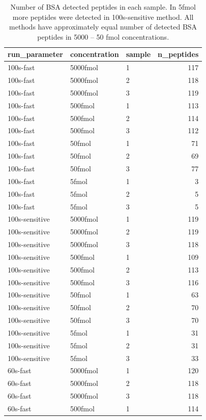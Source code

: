 \documentclass[]{article}
\begin{document}
\begin{table}
\caption{\label{tab:tbl1}Number of BSA detected peptides in each sample. In 5fmol more peptides were detected in 100s-sensitive method. All methods have approximately equal number of detected BSA peptides in 5000 -- 50 fmol concentrations.}
\centering
\begin{tabular}[t]{l|l|l|r}
\hline
run\_parameter & concentration & sample & n\_peptides\\
\hline
100s-fast & 5000fmol & 1 & 117\\
\hline
100s-fast & 5000fmol & 2 & 118\\
\hline
100s-fast & 5000fmol & 3 & 119\\
\hline
100s-fast & 500fmol & 1 & 113\\
\hline
100s-fast & 500fmol & 2 & 114\\
\hline
100s-fast & 500fmol & 3 & 112\\
\hline
100s-fast & 50fmol & 1 & 71\\
\hline
100s-fast & 50fmol & 2 & 69\\
\hline
100s-fast & 50fmol & 3 & 77\\
\hline
100s-fast & 5fmol & 1 & 3\\
\hline
100s-fast & 5fmol & 2 & 5\\
\hline
100s-fast & 5fmol & 3 & 5\\
\hline
100s-sensitive & 5000fmol & 1 & 119\\
\hline
100s-sensitive & 5000fmol & 2 & 119\\
\hline
100s-sensitive & 5000fmol & 3 & 118\\
\hline
100s-sensitive & 500fmol & 1 & 109\\
\hline
100s-sensitive & 500fmol & 2 & 113\\
\hline
100s-sensitive & 500fmol & 3 & 116\\
\hline
100s-sensitive & 50fmol & 1 & 63\\
\hline
100s-sensitive & 50fmol & 2 & 70\\
\hline
100s-sensitive & 50fmol & 3 & 70\\
\hline
100s-sensitive & 5fmol & 1 & 31\\
\hline
100s-sensitive & 5fmol & 2 & 31\\
\hline
100s-sensitive & 5fmol & 3 & 33\\
\hline
60s-fast & 5000fmol & 1 & 120\\
\hline
60s-fast & 5000fmol & 2 & 118\\
\hline
60s-fast & 5000fmol & 3 & 118\\
\hline
60s-fast & 500fmol & 1 & 114\\

\end{tabular}
\end{table}
\end{document}
